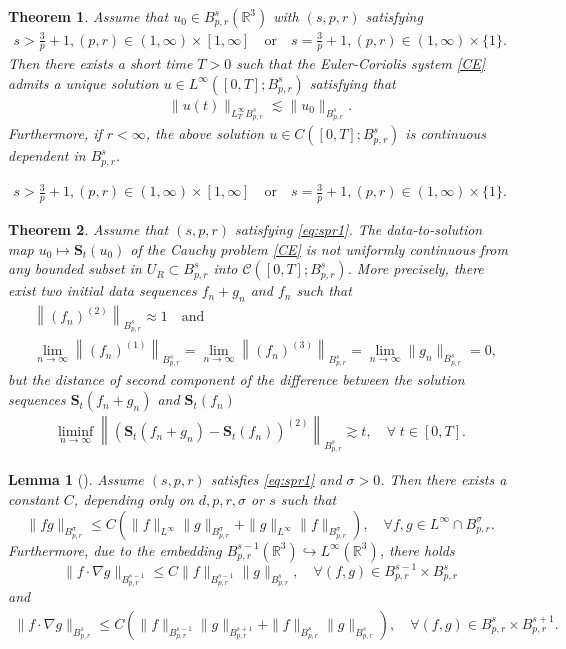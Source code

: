 \documentclass[10pt,a4paper]{amsart}
\newtheorem{theorem}{Theorem}
\newtheorem{lemma}{Lemma}
\newcommand{\R}{\mathbb{R}}
\newcommand{\bbal}{\begin{align*}}
\newcommand{\f}{\left}
\newcommand{\g}{\right}
\newcommand{\les}{\lesssim}
\newcommand{\na}{\nabla}
\begin{document}
\begin{theorem}\label{th1}
Assume that $u_0\in B^s_{p,r}(\R^3)$ with $(s,p,r)$ satisfying
\begin{align}\label{eq:spr1}
s>\frac{3}{p}+1, (p,r)\in (1,\infty)\times [1,\infty] \quad   \mathrm{or}    \quad s=\frac{3}{p}+1, (p,r)\in (1,\infty)\times\{1\}.
\end{align}
Then there exists a short time $T>0$ such that the Euler-Coriolis system \eqref{CE} admits a unique solution $u\in L^\infty([0,T];B^s_{p,r})$ satisfying that
\begin{align}\label{hx}
\|u(t)\|_{L^\infty_TB^s_{p,r}}\les\|u_0\|_{B^s_{p,r}}.
\end{align}
Furthermore, if $r<\infty$, the above solution $u\in C([0,T];B^s_{p,r})$ is continuous dependent in $B^s_{p,r}$.
\end{theorem}

\begin{align}
s>\frac{3}{p}+1, (p,r)\in (1,\infty)\times [1,\infty] \quad   \mathrm{or}    \quad s=\frac{3}{p}+1, (p,r)\in (1,\infty)\times\{1\}.
\end{align}

\begin{theorem}\label{th2}
Assume that $(s,p,r)$ satisfying \eqref{eq:spr1}.  The data-to-solution map $u_0\mapsto \mathbf{S}_{t}(u_0)$ of the Cauchy problem \eqref{CE} is not uniformly continuous from any bounded subset in $U_R\subset B^s_{p,r}$ into $\mathcal{C}([0,T];B^s_{p,r})$. More precisely, there exist two initial data sequences $f_n+g_n$ and $f_n$ such that
\bbal
&\f\|(f_n)^{(2)}\g\|_{B^s_{p,r}}\approx 1 \quad\text{and}\\
 &\lim_{n\rightarrow \infty}\f\|(f_n)^{(1)}\g\|_{B^s_{p,r}}=\lim_{n\rightarrow \infty}\f\|(f_n)^{(3)}\g\|_{B^s_{p,r}}=\lim_{n\rightarrow \infty}\|g_n\|_{B^s_{p,r}}= 0,
\end{align*}
but the distance of second component of the difference between the solution sequences $\mathbf{S}_t(f_n+g_n)$ and $\mathbf{S}_t(f_n)$
\bbal
\liminf_{n\rightarrow \infty}\f\|\f(\mathbf{S}_t(f_n+g_n)-\mathbf{S}_t(f_n)\g)^{(2)}\g\|_{B^s_{p,r}}\gtrsim t,  \quad \forall \;t\in[0,T].
\end{align*}
\end{theorem}

\begin{lemma}[\cite{B}]\label{lp}
Assume $(s,p,r)$ satisfies \eqref{eq:spr1} and $\sigma>0$. Then
 there exists a constant $C$, depending only on $d,p,r,\sigma$ or $s$ such that
$$\|fg\|_{B^{\sigma}_{p,r}}\leq C\f(\|f\|_{L^\infty}\|g\|_{B^\sigma_{p,r}}+\|g\|_{L^\infty}\|f\|_{B^{\sigma}_{p,r}}\g),\quad \forall f,g\in L^\infty\cap B^{\sigma}_{p,r}.$$
Furthermore, due to the embedding $B^{s-1}_{p,r}(\R^3)\hookrightarrow L^{\infty}(\R^3)$, there holds
$$\|f\cdot \na g\|_{B^{s-1}_{p,r}}\leq C\|f\|_{B^{s-1}_{p,r}}\|g\|_{B^s_{p,r}},\quad \forall(f,g)\in B^{s-1}_{p,r}\times B^s_{p,r}$$
and
\begin{align}\label{cj}
\|f\cdot \na g\|_{B^{s}_{p,r}}\leq C\f(\|f\|_{B^{s-1}_{p,r}}\|g\|_{B^{s+1}_{p,r}}+\|f\|_{B^{s}_{p,r}}\|g\|_{B^{s}_{p,r}}\g),\quad \forall(f,g)\in B^{s}_{p,r}\times B^{s+1}_{p,r}.
\end{align}
\end{lemma}
\end{document}
